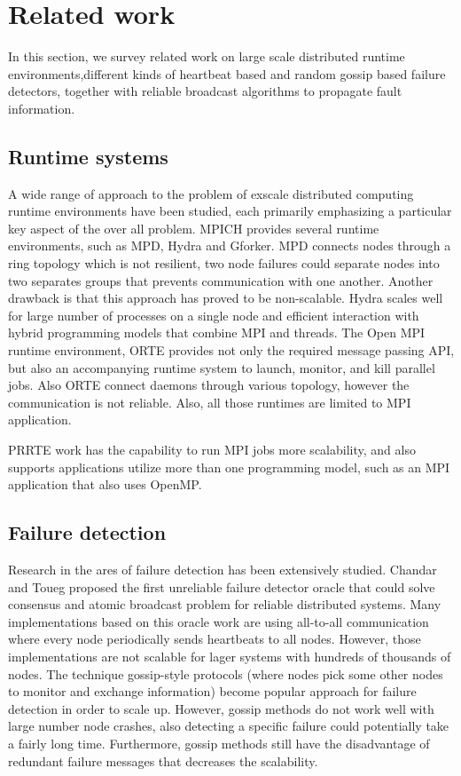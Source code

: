 \documentclass[sigconf]{acmart}
\begin{document}
\section{Related work}
In this section, we survey related work on large scale distributed runtime environments,different kinds of heartbeat based and random gossip based failure detectors, together with reliable broadcast algorithms to propagate fault information.

\subsection{Runtime systems}
A wide range of approach to the problem of exscale distributed computing runtime environments have been studied, each primarily emphasizing a particular key aspect of the over all problem. MPICH provides several runtime environments, such as MPD\cite{Butler00}, Hydra and Gforker\cite{MPICH14}. MPD connects nodes through a ring topology which is not resilient, two node failures could separate nodes into two separates groups that prevents communication with one another. Another drawback is that this approach has proved to be non-scalable. Hydra scales well for large number of processes on a single node and efficient interaction with hybrid programming models that combine MPI and threads. The Open MPI runtime environment, ORTE\cite{Castain05}\cite{Jeffrey12} provides not only the required message passing API, but also an accompanying runtime system to launch, monitor, and kill parallel jobs. Also ORTE connect daemons through various topology, however the communication is not reliable. Also, all those runtimes are limited to MPI application.

PRRTE work has the capability to run MPI jobs more scalability, and also supports applications utilize more than one programming model, such as an MPI application that also uses OpenMP. 

\subsection{Failure detection}
Research in the ares of failure detection has been extensively studied. Chandar and Toueg\cite{Chandra96} proposed the first unreliable failure detector oracle that could solve consensus and atomic broadcast problem for reliable distributed systems. Many implementations\cite{Wei02}\cite{Larrea00}\cite{Kawazoe97} based on this oracle work are using all-to-all communication where every node periodically sends heartbeats to all nodes. However, those implementations are not scalable for lager systems with hundreds of thousands of nodes. The technique gossip-style protocols\cite{van98} \cite{Ranganathan01}\cite{Gupta01}\cite{Abhinandan02}  (where nodes pick some other nodes to monitor and exchange information) become popular approach for failure detection in order to scale up. However, gossip methods do not work well with large number node crashes, also detecting a specific failure could potentially take a fairly long time. Furthermore, gossip methods still have the disadvantage of redundant failure messages that decreases the scalability.
\end{document}
